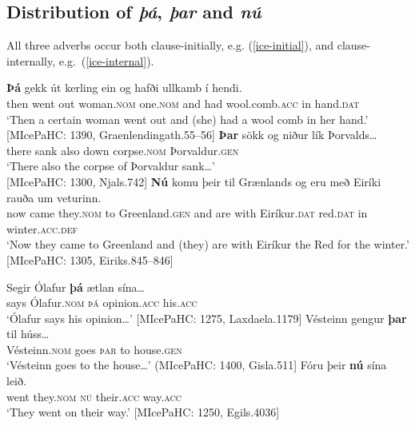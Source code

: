 \documentclass[output=paper,colorlinks,citecolor=brown]{langscibook}
\begin{document}
\subsection{Distribution of \textit{þá}, \textit{þar} and \textit{nú}}

All three adverbs occur both clause-initially, e.g. (\ref{ice-initial}), and clause-internally, e.g.~(\ref{ice-internal}).

\ea \label{ice-initial}
\ea
\gll \textbf{Þá} gekk út kerling ein og hafði ullkamb í hendi.\\
then went out woman.\textsc{nom} one.\textsc{nom} and had wool.comb.\textsc{acc} in hand.\textsc{dat}\\
\glt `Then a certain woman went out and (she) had a wool comb in her hand.' \hfill [MIcePaHC: 1390, Graenlendingath.55--56]
\ex 
\gll \textbf{Þar} sökk og niður lík Þorvalds\dots \\
there sank also down corpse.\textsc{nom} Þorvaldur.\textsc{gen}\\
\glt `There also the corpse of Þorvaldur sank\dots' \\ \hfill [MIcePaHC: 1300, Njals.742]
\ex 
\gll \textbf{Nú} komu þeir til Grænlands og eru með Eiríki rauða um veturinn.\\
now came they.\textsc{nom} to Greenland.\textsc{gen} and are with Eiríkur.\textsc{dat} red.\textsc{dat} in winter.\textsc{acc.def}\\
\glt `Now they came to Greenland and (they) are with Eiríkur the Red for the winter.' \hfill [MIcePaHC: 1305, Eiriks.845--846]
\z 
\z 

\ea \label{ice-internal}
\ea
\gll Segir Ólafur \textbf{þá} ætlan sína\dots \\
says Ólafur.\textsc{nom} \textsc{þá} opinion.\textsc{acc} his.\textsc{acc}\\
\glt `Ólafur says his opinion\dots' \hfill [MIcePaHC: 1275, Laxdaela.1179]
\ex
\gll Vésteinn gengur \textbf{þar} til húss\dots\\
Vésteinn.\textsc{nom} goes \textsc{þar} to house.\textsc{gen}\\
\glt `Vésteinn goes to the house\dots' \hfill (MIcePaHC: 1400, Gisla.511]
\ex 
\gll Fóru þeir \textbf{nú} sína leið.\\
went they.\textsc{nom} \textsc{nú} their.\textsc{acc} way.\textsc{acc}\\
\glt `They went on their way.' \hfill [MIcePaHC: 1250, Egils.4036]
\z 
\z 
\end{document}
